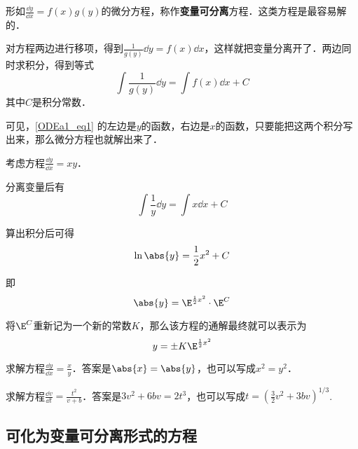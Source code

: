 

形如$\frac{\dd y}{\dd x}=f(x)g(y)$的微分方程，称作\textbf{变量可分离}方程．这类方程是最容易解的．

对方程两边进行移项，得到$\frac{1}{g(y)}\dd y=f(x)\dd x$，这样就把变量分离开了．两边同时求积分，得到等式
\begin{equation}\label{ODEa1_eq1}
\int\frac{1}{g(y)}\dd y=\int f(x)\dd x+C
\end{equation}
其中$C$是积分常数．

可见，\autoref{ODEa1_eq1} 的左边是$y$的函数，右边是$x$的函数，只要能把这两个积分写出来，那么微分方程也就解出来了．

\begin{example}{}
考虑方程$\frac{\dd y}{\dd x}=xy$．

分离变量后有
\begin{equation}
\int\frac{1}{y}\dd y=\int x\dd x+C
\end{equation}

算出积分后可得
\begin{equation}
\ln\abs{y}=\frac{1}{2}x^2+C
\end{equation}

即
\begin{equation}
\abs{y}=\E^{\frac{1}{2}x^2}\cdot\E^C
\end{equation}

将$\E^C$重新记为一个新的常数$K$，那么该方程的通解最终就可以表示为
\begin{equation}
y=\pm K\E^{\frac{1}{2}x^2}
\end{equation}
\end{example}

\begin{exercise}{}
求解方程$\frac{\dd y}{\dd x}=\frac{x}{y}$．答案是$\abs{x}=\abs{y}$，也可以写成$x^2=y^2$．
\end{exercise}

\begin{exercise}{}
求解方程$\frac{\dd v}{\dd t}=\frac{t^2}{v+b}$．答案是$3v^2+6bv=2t^3$，也可以写成$t=(\frac{3}{2}v^2+3bv)^{1/3}$.
\end{exercise}

\subsection{可化为变量可分离形式的方程}

